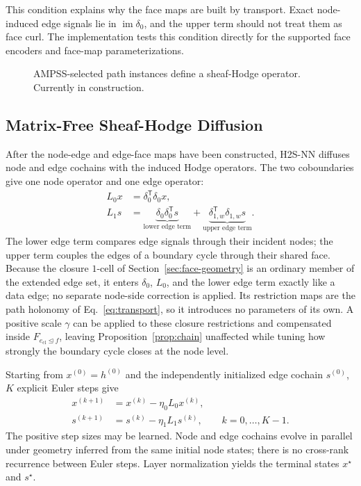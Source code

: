 \documentclass[sigconf,anonymous,review]{acmart}
\newcommand{\method}{\textsc{H2S-NN}}
\newcommand{\transpose}{\mathsf{T}}
\begin{document}
\noindent This condition explains why the face maps are built by transport.  Exact node-induced
edge signals lie in \(\operatorname{im}\delta_0\), and the upper term should not treat them as face
curl.  The implementation tests this condition directly for the supported face encoders and
face-map parameterizations.

\begin{figure}[t]
  \centering
  \fbox{\rule{0pt}{4.2cm}\rule{0.94\columnwidth}{0pt}}
  \caption{AMPSS-selected path instances define a sheaf-Hodge operator. Currently in construction.}
  \label{fig:sheaf-hodge-operator}
\end{figure}

\subsection{Matrix-Free Sheaf-Hodge Diffusion}
\label{sec:closure}

After the node-edge and edge-face maps have been constructed, \method{} diffuses node and edge
cochains with the induced Hodge operators.  The two coboundaries give one node operator and one edge
operator:
\begin{align}
  L_0x
  &=\delta_0^{\transpose}\delta_0x,
  \label{eq:l0}\\
  L_1s
  &=\underbrace{\delta_0\delta_0^{\transpose}s}_{\text{lower edge term}}
    +\underbrace{\delta_{1,w}^{\transpose}\delta_{1,w}s}_{\text{upper edge term}} .
  \label{eq:l1}
\end{align}
The lower edge term compares edge signals through their incident nodes; the upper term couples the
edges of a boundary cycle through their shared face.  Because the closure \(1\)-cell of
Section~\ref{sec:face-geometry} is an ordinary member of the extended edge set, it enters
\(\delta_0\), \(L_0\), and the lower edge term exactly like a data edge; no separate node-side
correction is applied.  Its restriction maps are the path holonomy of Eq.~\eqref{eq:transport}, so
it introduces no parameters of its own.  A positive scale \(\gamma\) can be applied to these closure
restrictions and compensated inside \(F_{e_{\mathrm{cl}}\unlhd f}\), leaving
Proposition~\ref{prop:chain} unaffected while tuning how strongly the boundary cycle closes at the
node level.

Starting from \(x^{(0)}=h^{(0)}\) and the independently initialized edge cochain \(s^{(0)}\),
\(K\) explicit Euler steps give
\begin{equation}
  \begin{aligned}
  x^{(k+1)}&=x^{(k)}-\eta_0L_0x^{(k)},\\
  s^{(k+1)}&=s^{(k)}-\eta_1L_1s^{(k)},
  \qquad k=0,\ldots,K-1 .
  \end{aligned}
  \label{eq:diffusion}
\end{equation}
The positive step sizes may be learned.  Node and edge cochains evolve in parallel under geometry
inferred from the same initial node states; there is no cross-rank recurrence between Euler steps.
Layer normalization yields the terminal states \(x^\star\) and \(s^\star\).
\end{document}
